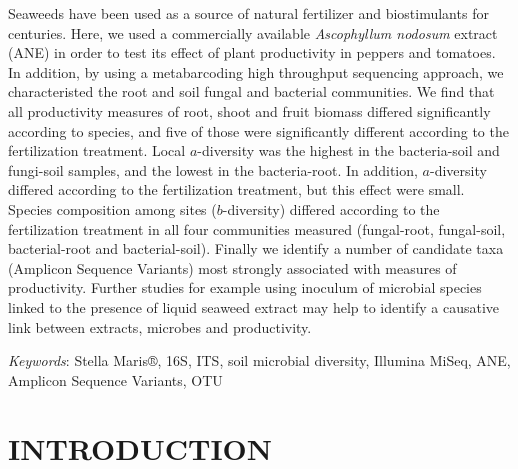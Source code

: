 \documentclass[11pt,]{article}
\renewenvironment{abstract}
 {{%
    \setlength{\leftmargin}{0mm}
    \setlength{\rightmargin}{\leftmargin}%
  }%
  \relax}
 {\endlist}
\begin{document}
\begin{abstract}

    \hbox{\vrule height .2pt width 39.14pc}

    \vskip 8.5pt %

\noindent Seaweeds have been used as a source of natural fertilizer and
biostimulants for centuries. Here, we used a commercially available
\emph{Ascophyllum nodosum} extract (ANE) in order to test its effect of
plant productivity in peppers and tomatoes. In addition, by using a
metabarcoding high throughput sequencing approach, we characteristed the
root and soil fungal and bacterial communities. We find that all
productivity measures of root, shoot and fruit biomass differed
significantly according to species, and five of those were significantly
different according to the fertilization treatment. Local
\(a\)-diversity was the highest in the bacteria-soil and fungi-soil
samples, and the lowest in the bacteria-root. In addition,
\(a\)-diversity differed according to the fertilization treatment, but
this effect were small. Species composition among sites
(\(b\)-diversity) differed according to the fertilization treatment in
all four communities measured (fungal-root, fungal-soil, bacterial-root
and bacterial-soil). Finally we identify a number of candidate taxa
(Amplicon Sequence Variants) most strongly associated with measures of
productivity. Further studies for example using inoculum of microbial
species linked to the presence of liquid seaweed extract may help to
identify a causative link between extracts, microbes and productivity.


\vskip 8.5pt \noindent \emph{Keywords}: Stella Maris®, 16S, ITS, soil microbial diversity, Illumina MiSeq, ANE,
Amplicon Sequence Variants, OTU \par

    \hbox{\vrule height .2pt width 39.14pc}



\end{abstract}


\vskip 6.5pt


\noindent \doublespacing \newpage 

\section{INTRODUCTION}\label{introduction}
\end{document}

